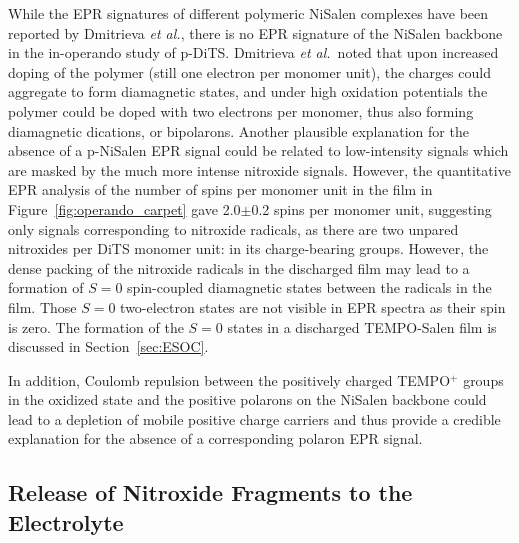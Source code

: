 \par
While the EPR signatures of different polymeric NiSalen complexes have been reported by Dmitrieva \textit{et al.},\cite{Dmitrieva2018} there is no EPR signature of the NiSalen backbone in the in-operando study of p-DiTS. Dmitrieva \textit{et al.}\ noted that upon increased doping of the polymer (still one electron per monomer unit), the charges could aggregate to form diamagnetic states, and under high oxidation potentials the polymer could be doped with two electrons per monomer, thus also forming diamagnetic dications, or bipolarons. Another plausible explanation for the absence of a p-NiSalen EPR signal could be related to low-intensity signals which are masked by the much more intense nitroxide signals. However, the quantitative EPR analysis of the number of spins per monomer unit in the film in Figure~\ref{fig:operando_carpet} gave 2.0$\pm$0.2 spins per monomer unit, suggesting only signals corresponding to nitroxide radicals, as there are two unpared nitroxides per DiTS monomer unit: in its charge-bearing groups. However, the dense packing of the nitroxide radicals in the discharged film may lead to a formation of $S=0$ spin-coupled diamagnetic states between the radicals in the film. Those $S=0$ two-electron states are not visible in EPR spectra as their spin is zero. The formation of the $S=0$ states in a discharged TEMPO-Salen film is discussed in Section~\ref{sec:ESOC}.

In addition, Coulomb repulsion between the positively charged TEMPO$^+$ groups in the oxidized state and the positive polarons on the NiSalen backbone could lead to a depletion of mobile positive charge carriers and thus provide a credible explanation for the absence of a corresponding polaron EPR signal.\\
\newpage


\subsection{Release of Nitroxide Fragments to the Electrolyte}

